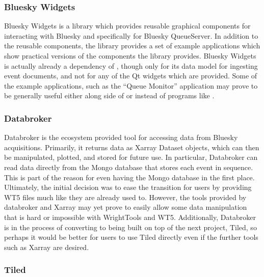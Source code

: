 \subsubsection{Bluesky Widgets}
Bluesky Widgets\cite{} is a library which provides reusable graphical components for interacting with Bluesky and specifically for Bluesky QueueServer.
In addition to the reusable components, the library provides a set of example applications which show practical versions of the components the library provides.
Bluesky Widgets is actually already a dependency of \blueskycmds{}, though only for its data model for ingesting event documents, and not for any of the Qt widgets which are provided.
Some of the example applications, such as the ``Queue Monitor'' application may prove to be generally useful either along side of or instead of programs like \blueskycmds{}.

\subsubsection{Databroker}
Databroker\cite{} is the ecosystem provided tool for accessing data from Bluesky acquisitions.
Primarily, it returns data as Xarray\cite{} Dataset objects, which can then be manipulated, plotted, and stored for future use.
In particular, Databroker can read data directly from the Mongo database that stores each event in sequence.
This is part of the reason for even having the Mongo database in the first place.
Ultimately, the initial decision was to ease the transition for users by providing WT5 files much like they are already used to.
However, the tools provided by databroker and Xarray may yet prove to easily allow some data manipulation that is hard or impossible with WrightTools and WT5.
Additionally, Databroker is in the process of converting to being built on top of the next project, Tiled, so perhaps it would be better for users to use Tiled directly even if the further tools such as Xarray are desired.

\subsubsection{Tiled}

